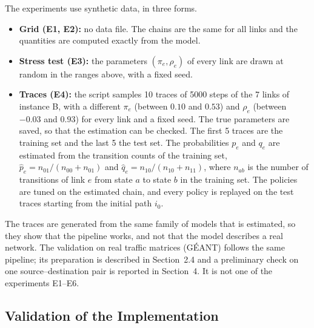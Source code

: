\documentclass{amsart}
\begin{document}
The experiments use synthetic data, in three forms.
\begin{itemize}
  \item \textbf{Grid (E1, E2):} no data file. The chains are the same for all links and the quantities are computed exactly from the model.
  \item \textbf{Stress test (E3):} the parameters $(\pi_e, \rho_e)$ of every link are drawn at random in the ranges above, with a fixed seed.
  \item \textbf{Traces (E4):} the script samples 10 traces of 5000 steps of the 7 links of instance B, with a different $\pi_e$ (between $0.10$ and $0.53$) and $\rho_e$ (between $-0.03$ and $0.93$) for every link and a fixed seed. The true parameters are saved, so that the estimation can be checked. The first 5 traces are the training set and the last 5 the test set. The probabilities $p_e$ and $q_e$ are estimated from the transition counts of the training set, $\hat p_e = n_{01}/(n_{00}+n_{01})$ and $\hat q_e = n_{10}/(n_{10}+n_{11})$, where $n_{ab}$ is the number of transitions of link $e$ from state $a$ to state $b$ in the training set. The policies are tuned on the estimated chain, and every policy is replayed on the test traces starting from the initial path $i_0$.
\end{itemize}
The traces are generated from the same family of models that is estimated, so they show that the pipeline works, and not that the model describes a real network. The validation on real traffic matrices (G\'{E}ANT) follows the same pipeline; its preparation is described in Section~2.4 and a preliminary check on one source--destination pair is reported in Section~4. It is not one of the experiments E1--E6.

\subsection{Validation of the Implementation}
\end{document}

